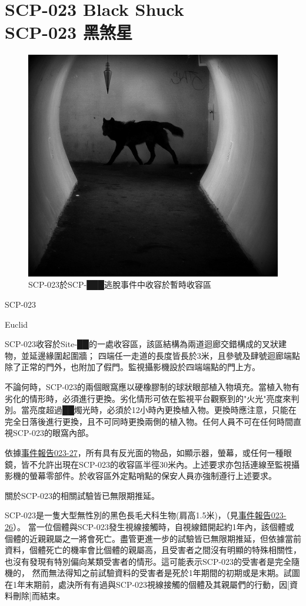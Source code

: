 \chapter[SCP-023 黑煞星]{
    SCP-023 Black Shuck\\
    SCP-023 黑煞星
}

\label{chap:SCP-023}

\begin{figure}[H]
    \centering
    \includegraphics[width=0.5\linewidth]{images/SCP.023.jpg}
    \caption*{SCP-023於SCP-███逃脫事件中收容於暫時收容區}
\end{figure}

SCP-023

Euclid

 SCP-023收容於Site-██的一處收容區，該區結構為兩道迴廊交錯構成的叉狀建物，並延邊緣圍起圍牆； 四端任一走道的長度皆長於3米，且參號及肆號迴廊端點除了正常的門外，也附加了假門。監視攝影機設於四端端點的門上方。

不論何時，SCP-023的兩個眼窩應以硬橡膠制的球狀眼部植入物填充。當植入物有劣化的情形時，必須進行更換。劣化情形可依在監視平台觀察到的"火光"亮度來判別。當亮度超過██燭光時，必須於12小時內更換植入物。更換時應注意，只能在完全日落後進行更換，且不可同時更換兩側的植入物。任何人員不可在任何時間直視SCP-023的眼窩內部。

依據\hyperref[sec:DOC-incident-023-27]{事件報告023-27}，所有具有反光面的物品，如顯示器，螢幕，或任何一種眼鏡，皆不允許出現在SCP-023的收容區半徑30米內。上述要求亦包括連線至監視攝影機的螢幕零部件。於收容區外定點哨點的保安人員亦強制遵行上述要求。

關於SCP-023的相關試驗皆已無限期推延。

SCP-023是一隻大型無性別的黑色長毛犬科生物(肩高1.5米)，（見\hyperref[sec:DOC-incident-report-023-26]{事件報告023-26}）。 當一位個體與SCP-023發生視線接觸時，自視線錯開起約1年內，該個體或個體的近親親屬之一將會死亡。盡管更進一步的試驗皆已無限期推延，但依據當前資料，個體死亡的機率會比個體的親屬高，且受害者之間沒有明顯的特殊相關性，也沒有發現有特別偏向某類受害者的情形。這可能表示SCP-023的受害者是完全隨機的， 然而無法得知之前試驗資料的受害者是死於1年期間的初期或是末期。試圖在1年末期前，處決所有有過與SCP-023視線接觸的個體及其親屬們的行動，因[資料刪除]而結束。

